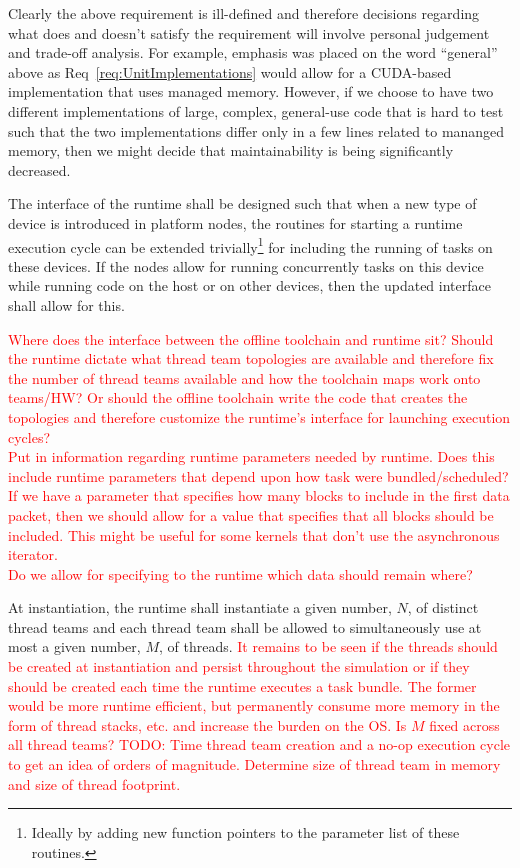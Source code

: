 \documentclass{article}
\begin{document}
Clearly the above requirement is ill-defined and therefore decisions regarding
what does and doesn't satisfy the requirement will involve personal judgement
and trade-off analysis.  For example, emphasis was placed on the word
``general'' above as Req~\ref{req:UnitImplementations} would allow for a
CUDA-based implementation that uses managed memory.  However, if we choose to
have two different implementations of large, complex, general-use code that is
hard to test such that the two implementations differ only in a few lines
related to mananged memory, then we might decide that maintainability is being
significantly decreased.

\begin{req}
The interface of the runtime shall be designed such  that when a new type of
device is introduced in platform nodes, the routines for starting a runtime
execution cycle can be extended trivially\footnote{Ideally by adding new function
pointers to the parameter list of these routines.} for including the running of
tasks on these devices.  If the nodes allow for running concurrently tasks on
this device while running code on the host or on other devices, then the updated
interface shall allow for this.
\end{req}

\textcolor{red}{Where does the interface between the offline toolchain and
runtime sit?  Should the runtime dictate what thread team topologies are
available and therefore fix the number of thread teams available and how the
toolchain maps work onto teams/HW?  Or should the offline toolchain write the
code that creates the topologies and therefore customize the runtime's interface
for launching execution cycles?}\\

\textcolor{red}{Put in information regarding runtime parameters needed by
runtime.  Does this include runtime parameters that depend upon how task were
bundled/scheduled?  If we have a parameter that specifies how many blocks to
include in the first data packet, then we should allow for a value that
specifies that all blocks should be included.  This might be useful for some
kernels that don't use the asynchronous iterator.}\\

\textcolor{red}{Do we allow for specifying to the runtime which data should
remain where?}

\begin{req}
At instantiation, the runtime shall instantiate a given number, $N$, of distinct
thread teams and each thread team shall be allowed to simultaneously use
at most a given number, $M$, of threads.  \textcolor{red}{It remains to be seen
if the threads should be created at instantiation and persist throughout the
simulation or if they should be created each time the runtime executes a task
bundle.  The former would be more runtime efficient, but permanently consume
more memory in the form of thread stacks, etc. and increase the burden on the
OS.  Is $M$ fixed across all thread teams?  TODO: Time thread team creation and
a no-op execution cycle to get an idea of orders of magnitude.  Determine size
of thread team in memory and size of thread footprint.}
\end{req}
\end{document}
